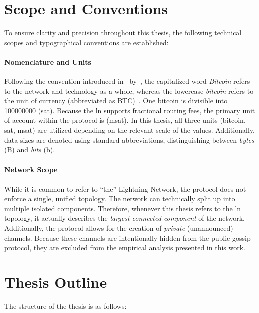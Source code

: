 \section{Scope and Conventions}
To ensure clarity and precision throughout this thesis, 
the following technical scopes and typographical conventions are established:

\paragraph{Nomenclature and Units}
Following the convention introduced in~ by~\citeauthor{antonopoulos_mastering_2021}, 
the capitalized word \textit{Bitcoin} refers to the network and technology as a whole, 
whereas the lowercase \textit{bitcoin} refers to the unit of currency (abbreviated as BTC)~\cite{antonopoulos_mastering_2021}. 
One bitcoin is divisible into \num{100000000}  (sat). 
Because the \gls{ln} supports fractional routing fees, the primary unit of account 
within the protocol is  (msat). 
In this thesis, all three units (bitcoin, sat, msat) are utilized depending on the relevant scale of the values. 
Additionally, data sizes are denoted using standard abbreviations, 
distinguishing between \textit{bytes} (B) and \textit{bits} (b).

\paragraph{Network Scope}
While it is common to refer to \enquote{the} Lightning Network, 
the protocol does not enforce a single, unified topology. 
The network can technically split up into multiple isolated components. 
Therefore, whenever this thesis refers to the \gls{ln} topology, 
it actually describes the \textit{largest connected component} of the network. 
Additionally, the protocol allows for the creation of \textit{private} (unannounced) channels. 
Because these channels are intentionally hidden from the public gossip protocol, 
they are excluded from the empirical analysis presented in this work.
\newpage


\section*{Thesis Outline}

The structure of the thesis is as follows:

